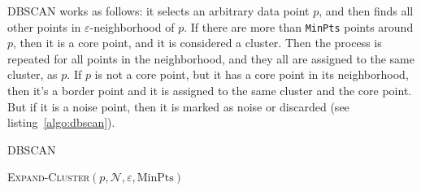 DBSCAN works as follows: it selects an arbitrary data point $p$, and then
finds all other points in $\varepsilon$-neighborhood of $p$. If
there are more than  \verb|MinPts| points around $p$, then it is a core point,
and it is considered a cluster. Then the process is repeated for all points in
the neighborhood, and they all are assigned to the same cluster, as $p$.
If $p$ is not a core point, but it has a core point in its neighborhood, then
it's a border point and it is assigned to the same cluster and the core point.
But if it is a noise point, then it is marked as noise or discarded
(see listing~\ref{algo:dbscan}).


\begin{algorithm}
\caption{DBSCAN}
\label{algo:dbscan}

\begin{algorithmic}[0]
  \Statex

      \EndIf
      \Else
            {\textsc{Expand-Cluster}$(p, \mathcal N, \varepsilon, \text{MinPts})$}
      \EndIf
    \EndFor
    \State {}
  \EndFunction
\end{algorithmic}


\begin{algorithmic}[0]
  \Statex
        \EndIf

        \EndIf

     \EndFor

     \State {}
  \EndFunction
\end{algorithmic}

\begin{algorithmic}[0]
  \Statex
     \State {} 
  \EndFunction
\end{algorithmic}

\end{algorithm}


